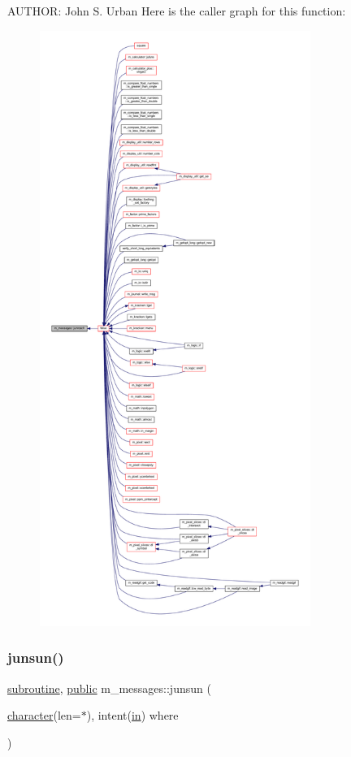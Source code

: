 A\+U\+T\+H\+OR\+: John S. Urban Here is the caller graph for this function\+:
\nopagebreak
\begin{figure}[H]
\begin{center}
\leavevmode
\includegraphics[height=550pt]{namespacem__messages_a986ae6ab4c767cfedb3e8eb2894224db_icgraph}
\end{center}
\end{figure}
\mbox{\label{namespacem__messages_a93650d7a0b4288d714aa9eb575366137}} 
\subsubsection{\texorpdfstring{junsun()}{junsun()}}
{\footnotesize\ttfamily \hyperlink{M__stopwatch_83_8txt_acfbcff50169d691ff02d4a123ed70482}{subroutine}, \hyperlink{M__stopwatch_83_8txt_a2f74811300c361e53b430611a7d1769f}{public} m\+\_\+messages\+::junsun (\begin{DoxyParamCaption}\item[{\hyperlink{option__stopwatch_83_8txt_abd4b21fbbd175834027b5224bfe97e66}{character}(len=$\ast$), intent(\hyperlink{M__journal_83_8txt_afce72651d1eed785a2132bee863b2f38}{in})}]{where }\end{DoxyParamCaption})}



